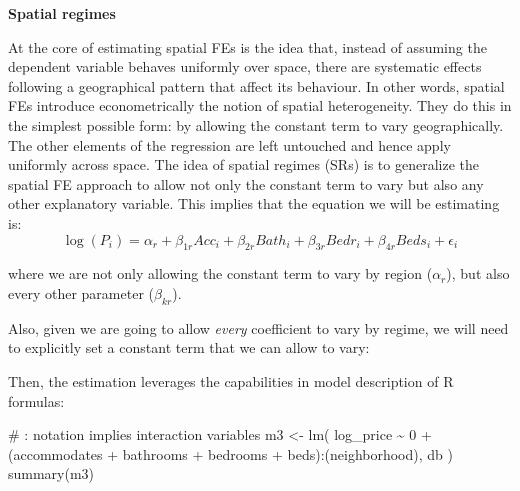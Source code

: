 \documentclass[
  letterpaper,
  krantz2]{style/krantz}
\newenvironment{Shaded}{\begin{snugshade}}{\end{snugshade}}
\newcommand{\CommentTok}[1]{\textcolor[rgb]{0.37,0.37,0.37}{#1}}
\newcommand{\DecValTok}[1]{\textcolor[rgb]{0.68,0.00,0.00}{#1}}
\newcommand{\FunctionTok}[1]{\textcolor[rgb]{0.28,0.35,0.67}{#1}}
\newcommand{\NormalTok}[1]{\textcolor[rgb]{0.00,0.23,0.31}{#1}}
\newcommand{\OtherTok}[1]{\textcolor[rgb]{0.00,0.23,0.31}{#1}}
\newcommand{\SpecialCharTok}[1]{\textcolor[rgb]{0.37,0.37,0.37}{#1}}
\newcommand{\StringTok}[1]{\textcolor[rgb]{0.13,0.47,0.30}{#1}}
\begin{document}
\textbf{Spatial regimes}

At the core of estimating spatial FEs is the idea that, instead of
assuming the dependent variable behaves uniformly over space, there are
systematic effects following a geographical pattern that affect its
behaviour. In other words, spatial FEs introduce econometrically the
notion of spatial heterogeneity. They do this in the simplest possible
form: by allowing the constant term to vary geographically. The other
elements of the regression are left untouched and hence apply uniformly
across space. The idea of spatial regimes (SRs) is to generalize the
spatial FE approach to allow not only the constant term to vary but also
any other explanatory variable. This implies that the equation we will
be estimating is: \[
\log(P_i) = \alpha_r + \beta_{1r} Acc_i + \beta_{2r} Bath_i + \beta_{3r} Bedr_i + \beta_{4r} Beds_i + \epsilon_i
\]

where we are not only allowing the constant term to vary by region
(\(\alpha_r\)), but also every other parameter (\(\beta_{kr}\)).

Also, given we are going to allow \emph{every} coefficient to vary by
regime, we will need to explicitly set a constant term that we can allow
to vary:

\begin{Shaded}
\end{Shaded}

Then, the estimation leverages the capabilities in model description of
R formulas:

\begin{Shaded}
\begin{Highlighting}[]
\CommentTok{\# \textasciigrave{}:\textasciigrave{} notation implies interaction variables}
\NormalTok{m3 }\OtherTok{\textless{}{-}} \FunctionTok{lm}\NormalTok{(}
  \StringTok{\textquotesingle{}log\_price \textasciitilde{} 0 + (accommodates + bathrooms + bedrooms + beds):(neighborhood)\textquotesingle{}}\NormalTok{, }
\NormalTok{  db}
\NormalTok{)}
\FunctionTok{summary}\NormalTok{(m3)}
\end{Highlighting}
\end{Shaded}
\end{document}
